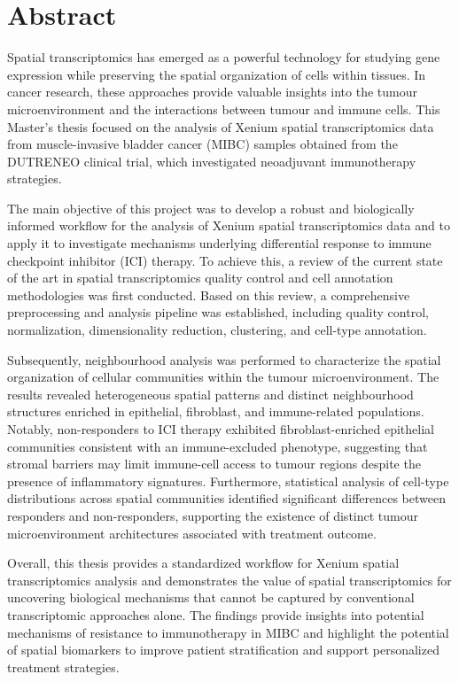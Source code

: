 \chapter*{Abstract}

Spatial transcriptomics has emerged as a powerful technology for studying gene expression while preserving the spatial organization of cells within tissues. In cancer research, these approaches provide valuable insights into the tumour microenvironment and the interactions between tumour and immune cells. This Master's thesis focused on the analysis of Xenium spatial transcriptomics data from muscle-invasive bladder cancer (MIBC) samples obtained from the DUTRENEO clinical trial, which investigated neoadjuvant immunotherapy strategies.

The main objective of this project was to develop a robust and biologically informed workflow for the analysis of Xenium spatial transcriptomics data and to apply it to investigate mechanisms underlying differential response to immune checkpoint inhibitor (ICI) therapy. To achieve this, a review of the current state of the art in spatial transcriptomics quality control and cell annotation methodologies was first conducted. Based on this review, a comprehensive preprocessing and analysis pipeline was established, including quality control, normalization, dimensionality reduction, clustering, and cell-type annotation.

Subsequently, neighbourhood analysis was performed to characterize the spatial organization of cellular communities within the tumour microenvironment. The results revealed heterogeneous spatial patterns and distinct neighbourhood structures enriched in epithelial, fibroblast, and immune-related populations. Notably, non-responders to ICI therapy exhibited fibroblast-enriched epithelial communities consistent with an immune-excluded phenotype, suggesting that stromal barriers may limit immune-cell access to tumour regions despite the presence of inflammatory signatures. Furthermore, statistical analysis of cell-type distributions across spatial communities identified significant differences between responders and non-responders, supporting the existence of distinct tumour microenvironment architectures associated with treatment outcome.

Overall, this thesis provides a standardized workflow for Xenium spatial transcriptomics analysis and demonstrates the value of spatial transcriptomics for uncovering biological mechanisms that cannot be captured by conventional transcriptomic approaches alone. The findings provide insights into potential mechanisms of resistance to immunotherapy in MIBC and highlight the potential of spatial biomarkers to improve patient stratification and support personalized treatment strategies.

